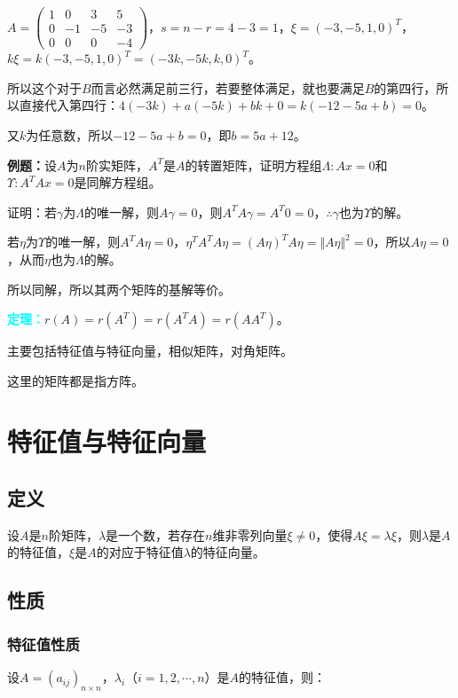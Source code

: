 \documentclass[UTF8, 12pt]{ctexart}
\begin{document}
$A=\left(\begin{array}{cccc}
1 & 0 & 3 & 5 \\
0 & -1 & -5 & -3 \\
0 & 0 & 0 & -4
\end{array}\right)$，$s=n-r=4-3=1$，$\xi=(-3,-5,1,0)^T$，$k\xi=k(-3,-5,1,0)^T=(-3k,-5k,k,0)^T$。

所以这个对于$B$而言必然满足前三行，若要整体满足，就也要满足$B$的第四行，所以直接代入第四行：$4(-3k)+a(-5k)+bk+0=k(-12-5a+b)=0$。

又$k$为任意数，所以$-12-5a+b=0$，即$b=5a+12$。

\textbf{例题：}设$A$为$n$阶实矩阵，$A^T$是$A$的转置矩阵，证明方程组$\Lambda:Ax=0$和$\Upsilon:A^TAx=0$是同解方程组。

证明：若$\gamma$为$\Lambda$的唯一解，则$A\gamma=0$，则$A^TA\gamma=A^T0=0$，$\therefore\gamma$也为$\Upsilon$的解。

若$\eta$为$\Upsilon$的唯一解，则$A^TA\eta=0$，$\eta^TA^TA\eta=(A\eta)^TA\eta=\Vert A\eta\Vert^2=0$，所以$A\eta=0$，从而$\eta$也为$\Lambda$的解。

所以同解，所以其两个矩阵的基解等价。

\textcolor{aqua}{\textbf{定理：}}$r(A)=r(A^T)=r(A^TA)=r(AA^T)$。

主要包括特征值与特征向量，相似矩阵，对角矩阵。

这里的矩阵都是指方阵。

\section{特征值与特征向量}

\subsection{定义}

设$A$是$n$阶矩阵，$\lambda$是一个数，若存在$n$维非零列向量$\xi\neq0$，使得$A\xi=\lambda\xi$，则$\lambda$是$A$的特征值，$\xi$是$A$的对应于特征值$\lambda$的特征向量。

\subsection{性质}

\subsubsection{特征值性质}

设$A=(a_{ij})_{n\times n}$，$\lambda_i$（$i=1,2,\cdots,n$）是$A$的特征值，则：
\end{document}
